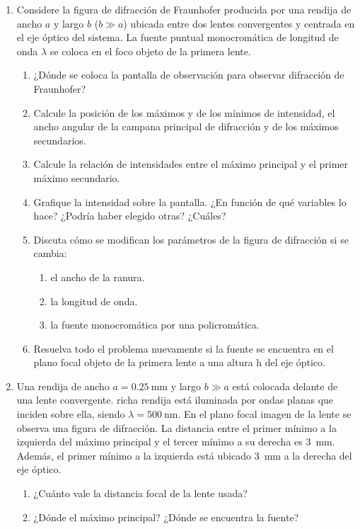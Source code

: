 \documentclass[11pt,spanish,a4paper]{article}
\begin{document}
\begin{enumerate}


\item
Considere la figura de difracción de Fraunhofer producida por una rendija de ancho \(a\) y largo \(b\) (\(b \gg  a\)) ubicada entre dos lentes convergentes y centrada en el eje óptico del sistema.
La fuente puntual monocromática de longitud de onda \(\lambda\) se coloca en el foco objeto de la primera lente.
\begin{enumerate}
	\item ¿Dónde se coloca la pantalla de observación para observar difracción de Fraunhofer?
	\item Calcule la posición de los máximos y de los mínimos de intensidad, el ancho angular de la campana principal de difracción y de los máximos secundarios.
	\item Calcule la relación de intensidades entre el máximo principal y el primer máximo secundario.
	\item Grafique la intensidad sobre la pantalla. ¿En función de qué variables lo hace? ¿Podría haber elegido otras? ¿Cuáles?
	\item Discuta cómo se modifican los parámetros de la figura de difracción si se cambia:
	\begin{enumerate}
		\item el ancho de la ranura.
		\item la longitud de onda.
		\item la fuente monocromática por una policromática.
	\end{enumerate}
	\item Resuelva todo el problema nuevamente si la fuente se encuentra en el plano focal objeto de la primera lente a una altura h del eje óptico.
\end{enumerate}


\item
Una rendija de ancho \(a = \SI{0.25}{\milli\metre}\) y largo \(b \gg a\) está colocada delante de una lente convergente.
richa rendija está iluminada por ondas planas que inciden sobre ella, siendo \(\lambda= \SI{500}{\nano\metre}\).
En el plano focal imagen de la lente se observa una figura de difracción.
La distancia entre el primer mínimo a la izquierda del máximo principal y el tercer mínimo a su derecha es \SI{3}{\milli\metre}.
Además, el primer mínimo a la izquierda está ubicado \SI{3}{\milli\metre} a la derecha del eje óptico.
\begin{enumerate}
	\item ¿Cuánto vale la distancia focal de la lente usada?
	\item ¿Dónde el máximo principal? ¿Dónde se encuentra la fuente?
\end{enumerate}



\end{enumerate}
\end{document}
